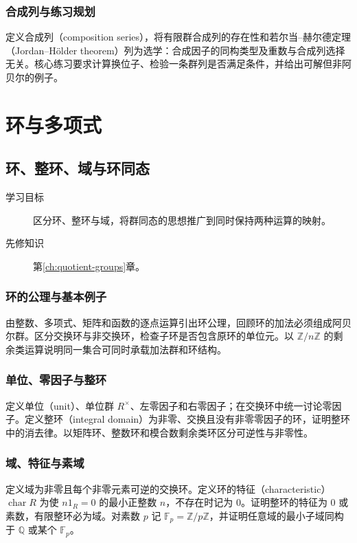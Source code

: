 \documentclass[UTF8,12pt,a4paper,fontset=fandol]{ctexbook}
\begin{document}
\section{合成列与练习规划}
定义合成列（composition series），将有限群合成列的存在性和若尔当--赫尔德定理（Jordan--Hölder theorem）列为选学：合成因子的同构类型及重数与合成列选择无关。核心练习要求计算换位子、检验一条群列是否满足条件，并给出可解但非阿贝尔的例子。

\part{环与多项式}

\chapter{环、整环、域与环同态}\label{ch:rings}

\begin{description}
  \item[学习目标] 区分环、整环与域，将群同态的思想推广到同时保持两种运算的映射。
  \item[先修知识] 第\ref{ch:quotient-groups}章。
\end{description}

\section{环的公理与基本例子}
由整数、多项式、矩阵和函数的逐点运算引出环公理，回顾环的加法必须组成阿贝尔群。区分交换环与非交换环，检查子环是否包含原环的单位元。以 $\mathbb Z/n\mathbb Z$ 的剩余类运算说明同一集合可同时承载加法群和环结构。

\section{单位、零因子与整环}
定义单位（unit）、单位群 $R^\times$、左零因子和右零因子；在交换环中统一讨论零因子。定义整环（integral domain）为非零、交换且没有非零零因子的环，证明整环中的消去律。以矩阵环、整数环和模合数剩余类环区分可逆性与非零性。

\section{域、特征与素域}
定义域为非零且每个非零元素可逆的交换环。定义环的特征（characteristic）$\operatorname{char}R$ 为使 $n1_R=0$ 的最小正整数 $n$，不存在时记为 $0$。证明整环的特征为 $0$ 或素数，有限整环必为域。对素数 $p$ 记 $\mathbb F_p=\mathbb Z/p\mathbb Z$，并证明任意域的最小子域同构于 $\mathbb Q$ 或某个 $\mathbb F_p$。
\end{document}
